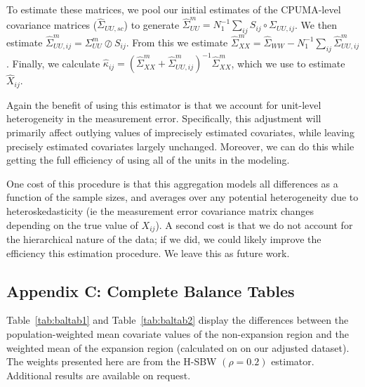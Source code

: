 \documentclass[12pt]{article}
\begin{document}
To estimate these matrices, we pool our initial estimates of the CPUMA-level covariance matrices ($\hat{\Sigma}_{UU, sc}$) to generate $\hat{\Sigma}_{UU}^m = N_1^{-1}\sum_{ij} S_{ij} \circ \Sigma_{UU, ij}$. We then estimate $\hat{\Sigma}_{UU, ij}^m = \Sigma_{UU}^m \oslash S_{ij}$. From this we estimate $\hat{\Sigma}^m_{XX} = \hat{\Sigma}_{WW} - N_1^{-1}\sum_{ij}\hat{\Sigma}^m_{UU, ij}$. Finally, we calculate $\hat{\kappa}_{ij} = (\hat{\Sigma}^m_{XX} + \hat{\Sigma}^m_{UU, ij})^{-1}\hat{\Sigma}^m_{XX}$, which we use to estimate $\hat{X}_{ij}$. 

Again the benefit of using this estimator is that we account for unit-level heterogeneity in the measurement error. Specifically, this adjustment will primarily affect outlying values of imprecisely estimated covariates, while leaving precisely estimated covariates largely unchanged. Moreover, we can do this while getting the full efficiency of using all of the units in the modeling. 

One cost of this procedure is that this aggregation models all differences as a function of the sample sizes, and averages over any potential heterogeneity due to heteroskedasticity (ie the measurement error covariance matrix changes depending on the true value of $X_{ij}$). A second cost is that we do not account for the hierarchical nature of the data; if we did, we could likely improve the efficiency this estimation procedure. We leave this as future work.

\subsection{Appendix C: Complete Balance Tables}

Table~\ref{tab:baltab1} and Table~\ref{tab:baltab2} display the differences between the population-weighted mean covariate values of the non-expansion region and the weighted mean of the expansion region (calculated on on our adjusted dataset). The weights presented here are from the H-SBW $(\rho = 0.2)$ estimator. Additional results are available on request.
\end{document}

